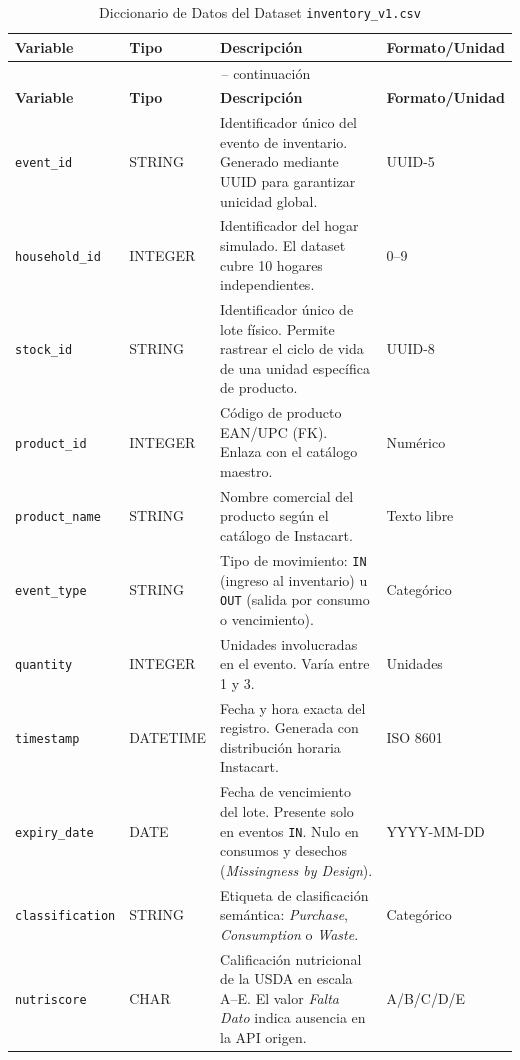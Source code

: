 \documentclass[12pt,a4paper]{article}
\newcommand{\code}[1]{\texttt{\small #1}}
\begin{document}
\begin{longtable}{@{}p{3.2cm}p{1.7cm}p{5.5cm}p{3cm}@{}}
\caption{Diccionario de Datos del Dataset \texttt{inventory\_v1.csv}}
\label{tab:datadict} \\
\toprule
\textbf{Variable} & \textbf{Tipo} & \textbf{Descripción} & \textbf{Formato/Unidad} \\
\midrule
\endfirsthead
\multicolumn{4}{c}{\tablename~\thetable{} -- continuación} \\
\toprule
\textbf{Variable} & \textbf{Tipo} & \textbf{Descripción} & \textbf{Formato/Unidad} \\
\midrule
\endhead
\bottomrule
\endfoot
\code{event\_id}     & STRING   & Identificador único del evento de inventario. Generado mediante UUID para garantizar unicidad global. & UUID-5 \\[4pt]
\code{household\_id} & INTEGER  & Identificador del hogar simulado. El dataset cubre 10 hogares independientes. & 0--9 \\[4pt]
\code{stock\_id}     & STRING   & Identificador único de lote físico. Permite rastrear el ciclo de vida de una unidad específica de producto. & UUID-8 \\[4pt]
\code{product\_id}   & INTEGER  & Código de producto EAN/UPC (FK). Enlaza con el catálogo maestro. & Numérico \\[4pt]
\code{product\_name} & STRING   & Nombre comercial del producto según el catálogo de Instacart. & Texto libre \\[4pt]
\code{event\_type}   & STRING   & Tipo de movimiento: \code{IN} (ingreso al inventario) u \code{OUT} (salida por consumo o vencimiento). & Categórico \\[4pt]
\code{quantity}      & INTEGER  & Unidades involucradas en el evento. Varía entre 1 y 3. & Unidades \\[4pt]
\code{timestamp}     & DATETIME & Fecha y hora exacta del registro. Generada con distribución horaria Instacart. & ISO 8601 \\[4pt]
\code{expiry\_date}  & DATE     & Fecha de vencimiento del lote. Presente solo en eventos \code{IN}. Nulo en consumos y desechos (\textit{Missingness by Design}). & YYYY-MM-DD \\[4pt]
\code{classification}& STRING   & Etiqueta de clasificación semántica: \textit{Purchase}, \textit{Consumption} o \textit{Waste}. & Categórico \\[4pt]
\code{nutriscore}    & CHAR     & Calificación nutricional de la USDA en escala A--E. El valor \textit{Falta Dato} indica ausencia en la API origen. & A/B/C/D/E \\[4pt]

\end{longtable}
\end{document}
